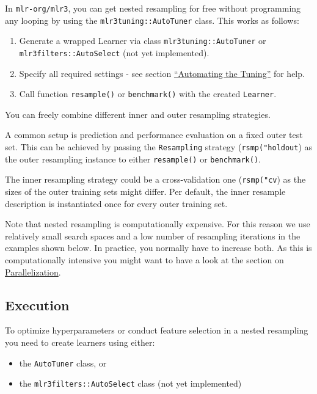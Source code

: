 \documentclass[
  11pt,
  parskip=half,
  DIV=calc,
  BCOR=10mm,
  x11names]{scrbook}
\providecommand{\tightlist}{%
  \setlength{\itemsep}{0pt}\setlength{\parskip}{0pt}}
\begin{document}
In \texttt{mlr-org/mlr3}, you can get nested resampling for free without programming any looping by using the \texttt{mlr3tuning::AutoTuner} class.
This works as follows:

\begin{enumerate}
\def\labelenumi{\arabic{enumi}.}
\tightlist
\item
  Generate a wrapped Learner via class \texttt{mlr3tuning::AutoTuner} or \texttt{mlr3filters::AutoSelect} (not yet implemented).
\item
  Specify all required settings - see section \protect\hyperlink{autotuner}{``Automating the Tuning''} for help.
\item
  Call function \texttt{resample()} or \texttt{benchmark()} with the created \texttt{Learner}.
\end{enumerate}

You can freely combine different inner and outer resampling strategies.

A common setup is prediction and performance evaluation on a fixed outer test set. This can be achieved by passing the \texttt{Resampling} strategy (\texttt{rsmp("holdout}) as the outer resampling instance to either \texttt{resample()} or \texttt{benchmark()}.

The inner resampling strategy could be a cross-validation one (\texttt{rsmp("cv}) as the sizes of the outer training sets might differ.
Per default, the inner resample description is instantiated once for every outer training set.

Note that nested resampling is computationally expensive.
For this reason we use relatively small search spaces and a low number of resampling iterations in the examples shown below.
In practice, you normally have to increase both.
As this is computationally intensive you might want to have a look at the section on \protect\hyperlink{parallelization}{Parallelization}.

\hypertarget{nested-resamp-exec}{%
\subsection{Execution}\label{nested-resamp-exec}}

To optimize hyperparameters or conduct feature selection in a nested resampling you need to create learners using either:

\begin{itemize}
\tightlist
\item
  the \texttt{AutoTuner} class, or
\item
  the \texttt{mlr3filters::AutoSelect} class (not yet implemented)
\end{itemize}
\end{document}
